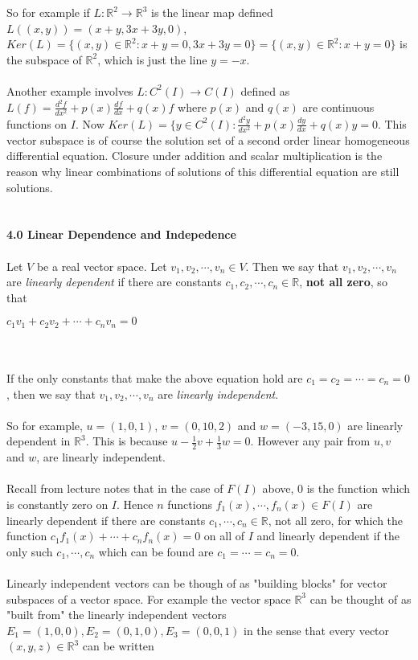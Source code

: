 \documentclass{amsart}
\begin{document}
So for example if $L:\mathbb{R}^{2}\rightarrow\mathbb{R}^{3}$ is the linear map defined $L((x,y))=(x+y, 3x+3y, 0)$, $Ker (L)=\{(x,y)\in\mathbb{R}^{2}:x+y=0,3x+3y=0\}=\{(x,y)\in\mathbb{R}^{2}:x+y=0\}$ is the subspace of $\mathbb{R}^{2}$, which is just the line $y=-x$.\\
\\
Another example involves $L:C^{2}(I)\rightarrow C(I)$ defined as $L(f)=\frac{d^{2}f}{dx^{2}}+p(x)\frac{df}{dx}+q(x)f$ where $p(x)$ and $q(x)$ are continuous functions on $I$. Now $Ker (L)=\{ y\in C^{2}(I):\frac{d^{2}y}{dx^{2}}+p(x)\frac{dy}{dx}+q(x)y=0$. This vector subspace is of course the solution set of a second order linear homogeneous differential equation. Closure under addition and scalar multiplication is the reason why linear combinations of solutions of this differential equation are still solutions.\\
\\
\\
{\bf 4.0 Linear Dependence and Indepedence}\\\\
Let $V$ be a real vector space. Let $v_1,v_2,\cdots,v_n\in V$. Then we say that $v_1,v_2,\cdots,v_n$ are {\it linearly dependent} if there are constants $c_1,c_2,\cdots,c_n\in \mathbb{R}$, {\bf not all zero}, so that\\
\centerline{$c_1v_1+c_2v_2+\cdots+c_nv_n=0$}\\
\\
If the only constants that make the above equation hold are $c_1=c_2=\cdots=c_n=0$, then we say that $v_1,v_2,\cdots,v_n$ are {\it linearly independent}.
\\\\
So for example, $u=(1,0,1)$, $v=(0,10,2)$ and $w=(-3,15,0)$ are linearly dependent in $\mathbb{R}^3$. This is because $u-\frac{1}{2}v+\frac{1}{3}w=0$. However any pair from $u,v$ and $w$, are linearly independent.\\
\\
Recall from lecture notes that in the case of $F(I)$ above, $0$ is the function which is constantly zero on $I$. Hence $n$ functions $f_1(x),\cdots,f_n(x)\in F(I)$ are linearly dependent if there are constants $c_1,\cdots,c_n\in \mathbb{R}$, not all zero, for which the function $c_1f_1(x)+\cdots+c_nf_n(x)=0$ on all of $I$ and linearly dependent if the only such $c_1,\cdots,c_n$ which can be found are $c_1=\cdots=c_n=0$.\\
\\
Linearly independent vectors can be though of as "building blocks" for vector subspaces of a vector space. For example the vector space $\mathbb{R}^{3}$ can be thought of as "built from" the linearly independent vectors $E_1=(1,0,0),E_2=(0,1,0),E_3=(0,0,1)$ in the sense that every vector $(x,y,z)\in\mathbb{R}^{3}$ can be written\\\\
\end{document}
